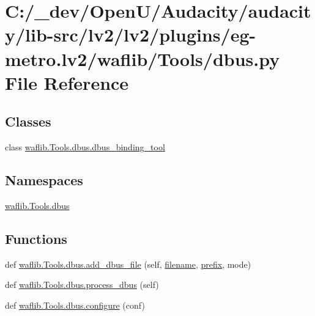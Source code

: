 \hypertarget{lv2_2plugins_2eg-metro_8lv2_2waflib_2_tools_2dbus_8py}{}\section{C\+:/\+\_\+dev/\+Open\+U/\+Audacity/audacity/lib-\/src/lv2/lv2/plugins/eg-\/metro.lv2/waflib/\+Tools/dbus.py File Reference}
\label{lv2_2plugins_2eg-metro_8lv2_2waflib_2_tools_2dbus_8py}
\subsection*{Classes}
\begin{DoxyCompactItemize}
\item 
class \hyperlink{classwaflib_1_1_tools_1_1dbus_1_1dbus__binding__tool}{waflib.\+Tools.\+dbus.\+dbus\+\_\+binding\+\_\+tool}
\end{DoxyCompactItemize}
\subsection*{Namespaces}
\begin{DoxyCompactItemize}
\item 
 \hyperlink{namespacewaflib_1_1_tools_1_1dbus}{waflib.\+Tools.\+dbus}
\end{DoxyCompactItemize}
\subsection*{Functions}
\begin{DoxyCompactItemize}
\item 
def \hyperlink{namespacewaflib_1_1_tools_1_1dbus_a6984c3a3293d830848a5b9e06326a353}{waflib.\+Tools.\+dbus.\+add\+\_\+dbus\+\_\+file} (self, \hyperlink{test__portburn_8cpp_a7efa5e9c7494c7d4586359300221aa5d}{filename}, \hyperlink{structprefix}{prefix}, mode)
\item 
def \hyperlink{namespacewaflib_1_1_tools_1_1dbus_a75dbed39a93f5b22ad67c948e91f2008}{waflib.\+Tools.\+dbus.\+process\+\_\+dbus} (self)
\item 
def \hyperlink{namespacewaflib_1_1_tools_1_1dbus_abce63288e0395b45e8006bd6cc81edb7}{waflib.\+Tools.\+dbus.\+configure} (conf)
\end{DoxyCompactItemize}
